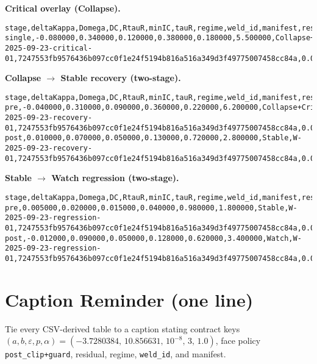 \medskip
\noindent\textbf{Critical overlay (Collapse).}
\begin{lstlisting}[style=umcpstyle, numbers=none, frame=single, basicstyle=\ttfamily\small, columns=fullflexible]
stage,deltaKappa,Domega,DC,RtauR,minIC,tauR,regime,weld_id,manifest,residual
single,-0.080000,0.340000,0.120000,0.380000,0.180000,5.500000,Collapse+Critical,W-2025-09-23-critical-01,7247553fb9576436b097cc0f1e24f5194b816a516a349d3f49775007458cc84a,0.0000
\end{lstlisting}

\medskip
\noindent\textbf{Collapse $\rightarrow$ Stable recovery (two-stage).}
\begin{lstlisting}[style=umcpstyle, numbers=none, frame=single, basicstyle=\ttfamily\small, columns=fullflexible]
stage,deltaKappa,Domega,DC,RtauR,minIC,tauR,regime,weld_id,manifest,residual
pre,-0.040000,0.310000,0.090000,0.360000,0.220000,6.200000,Collapse+Critical,W-2025-09-23-recovery-01,7247553fb9576436b097cc0f1e24f5194b816a516a349d3f49775007458cc84a,0.0000
post,0.010000,0.070000,0.050000,0.130000,0.720000,2.800000,Stable,W-2025-09-23-recovery-01,7247553fb9576436b097cc0f1e24f5194b816a516a349d3f49775007458cc84a,0.0000
\end{lstlisting}

\medskip
\noindent\textbf{Stable $\rightarrow$ Watch regression (two-stage).}
\begin{lstlisting}[style=umcpstyle, numbers=none, frame=single, basicstyle=\ttfamily\small, columns=fullflexible]
stage,deltaKappa,Domega,DC,RtauR,minIC,tauR,regime,weld_id,manifest,residual
pre,0.005000,0.020000,0.015000,0.040000,0.980000,1.800000,Stable,W-2025-09-23-regression-01,7247553fb9576436b097cc0f1e24f5194b816a516a349d3f49775007458cc84a,0.0000
post,-0.012000,0.090000,0.050000,0.128000,0.620000,3.400000,Watch,W-2025-09-23-regression-01,7247553fb9576436b097cc0f1e24f5194b816a516a349d3f49775007458cc84a,0.0000
\end{lstlisting}


\section{Caption Reminder (one line)}
\label{sec:csv-caption}
Tie every CSV-derived table to a caption stating contract keys\\ 
\((a,b,\varepsilon,p,\alpha)=(-3.7280384,\,10.856631,\,10^{-8},\,3,\,1.0)\), face policy \texttt{post\_clip+guard}, residual, regime, \texttt{weld\_id}, and manifest.


